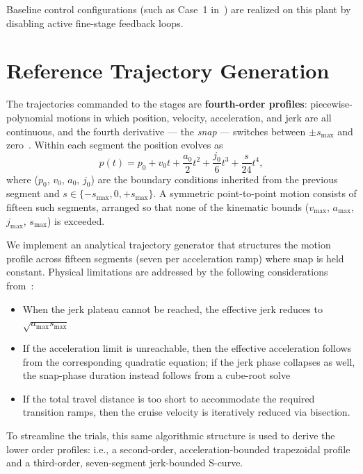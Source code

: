 Baseline control configurations (such as Case~1 in~\cite{Al-Rawashdeh2022_Caracterization}) are realized on this plant by disabling active fine-stage feedback loops.

\section{Reference Trajectory Generation}\label{sec:methodology_trajectories}

The trajectories commanded to the stages are \textbf{fourth-order profiles}: piecewise-polynomial motions in which position, velocity, acceleration, and jerk are all continuous, and the fourth derivative --- the \textit{snap} --- switches between $\pm s_{\max}$ and zero~\cite{Lambrechts2003_Trajectories}. Within each segment the position evolves as
\begin{equation}
    p(t) = p_0 + v_0 t + \frac{a_0}{2}t^2 + \frac{j_0}{6}t^3 + \frac{s}{24}t^4,
    \label{eq:fourth_order_poly}
\end{equation}
where ($p_0$, $v_0$, $a_0$, $j_0$) are the boundary conditions inherited from the previous segment and $s \in \{-s_{\max}, 0, +s_{\max}\}$. A symmetric point-to-point motion consists of fifteen such segments, arranged so that none of the kinematic bounds ($v_{\max}$, $a_{\max}$, $j_{\max}$, $s_{\max}$) is exceeded.

We implement an analytical trajectory generator that structures the motion profile across fifteen segments (seven per acceleration ramp) where snap is held constant. Physical limitations are addressed by the following considerations from~\cite{Lambrechts2003_Trajectories}:
\begin{itemize}
    \item When the jerk plateau cannot be reached, the effective jerk reduces to $\sqrt{a_{\max} s_{\max}}$
    \item If the acceleration limit is unreachable, then the effective acceleration follows from the corresponding quadratic equation; if the jerk phase collapses as well, the snap-phase duration instead follows from a cube-root solve
    \item If the total travel distance is too short to accommodate the required transition ramps, then the cruise velocity is iteratively reduced via bisection.
\end{itemize}
To streamline the trials, this same algorithmic structure is used to derive the lower order profiles: i.e., a second-order, acceleration-bounded trapezoidal profile and a third-order, seven-segment jerk-bounded S-curve.

